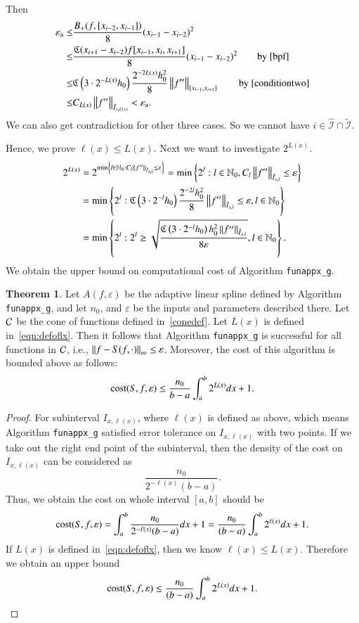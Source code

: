 \documentclass[review]{elsarticle}
\newcommand{\abstol}{\varepsilon_{\textrm{a}}}
\theoremstyle{definition}
\newtheorem{theorem}{Theorem}
\begin{document}
\begin{enumerate}
  Then
  \begin{align*}
  \abstol \le & \frac{B_+(f,[x_{i-2},x_{i-1}])}{8}(x_{i-1}-x_{i-2})^2 \\
 \le  &\frac{\fC(x_{i+1}-x_{i-2})f[x_{i-1},x_{i},x_{i+1}]}{8}(x_{i-1}-x_{i-2})^2 \qquad  \text{by } \eqref{bpf}   \\
 \le & \fC\left(3\cdot2^{-L(x)}h_0\right) \frac{2^{-2L(x)}h_0^2}{8}\norm[{[x_{i-1},x_{i+1}]}]{f''}  \qquad \text{by } \eqref{conditiontwo}    \\
     \le & C_{L(x)} \norm[\bar{I}_{x,L(x)}]{f''} < \abstol.
  \end{align*}
  We can also get contradiction for other three cases. So we cannot have $i \in \widehat{\mathcal{I}}\cap \widetilde{\mathcal{I}}$.
\end{enumerate}
Hence, we prove $\ell(x) \le L(x)$. Next we want to investigate $2^{L(x)}$.
\begin{align*}
2^{L(x)}&=2^{\min \left\{ l \in \natzero : C_l  \norm[\bar{I}_{x,l}]{f''} \le \varepsilon\right\}} = \min\left\{2^l: l \in  \natzero, C_l \norm[\bar{I}_{x,l}]{f''} \le \varepsilon\right\}\\
 & = \min\left\{2^l:  \fC\left(3\cdot 2^{-l} h_0\right) \frac{2^{-2l}h_0^2}{8} \norm[\bar{I}_{x,l}]{f''}  \le \varepsilon,  l \in  \natzero\right\}\nonumber \\
 & = \min\left\{2^l:  2^l \ge \sqrt{\frac{\fC\left(3\cdot 2^{-l} h_0\right) h_0^2 \norm[\bar{I}_{x,l}]{f''} }{8\varepsilon}},  l \in  \natzero\right\}.
\end{align*}
We obtain the upper bound on computational cost of Algorithm \texttt{funappx\_g}.

\begin{theorem}\label{thm:cost}
Let $A(f,\varepsilon)$ be the adaptive linear spline defined by Algorithm \textnormal{\texttt{funappx\_g}}, and let $n_0$, and $\varepsilon$ be the inputs and parameters described there. Let $\cc$ be the cone of functions defined in~\eqref{conedef}.
Let $L(x)$ is defined in~\eqref{eqn:defoflx}.
Then it follows that Algorithm \textnormal{\texttt{funappx\_g}} is successful for all functions in $\cc$,  i.e.,  $\norm[\infty]{f - S(f, \cdot)} \le \varepsilon$.  Moreover, the cost of this algorithm is bounded above as follows:
$$\cost(S,f,\varepsilon) \le \frac{n_0}{b-a}\int_a^b 2^{L(x)} dx +1.$$
\end{theorem}

\begin{proof}
For subinterval $I_{x,\ell(x)}$, where $\ell(x)$ is defined as above,
which means Algorithm \texttt{funappx\_g} satisfied error tolerance on $I_{x,\ell(x)}$ with two points.
If we take out the right end point of the subinterval, then the density of the cost on $I_{x,\ell(x)}$ can be considered as
$$\frac{n_0}{2^{-\ell(x)}(b-a)}.$$
Thus, we obtain the cost on whole interval $[a,b]$ should be
$$\cost(S,f,\varepsilon)  = \int_a^b \frac{n_0}{2^{-\ell(x)}(b-a)}dx +1= \frac{n_0}{(b-a)}\int_a^b 2^{\ell(x)}dx +1.
$$
If $L(x)$ is defined in~\eqref{eqn:defoflx}, then we know $\ell(x) \le L(x)$. Therefore we obtain an upper bound
$$\cost(S,f,\varepsilon)  \le \frac{n_0}{(b-a)}\int_a^b 2^{L(x)}dx +1.
$$
\end{proof}
\end{document}
